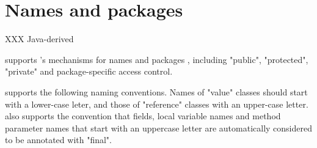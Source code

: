 \chapter{Names and packages}
\label{packages} 

XXX Java-derived

\Xten{} supports \java's mechanisms for names and packages \cite[\S
6,\S 7]{jls2}, including \xcd"public", \xcd"protected", \xcd"private"
and package-specific access control. 


\Xten{} supports the following naming conventions. Names of
\xcd"value" classes should start with a lower-case leter, and
those of \xcd"reference" classes with an upper-case letter. \Xten{} also 
supports the convention that fields, local variable names
and method parameter names that start with an uppercase letter are
automatically considered to be annotated with \xcd"final".
\label{LexicalConventionForFinals}



